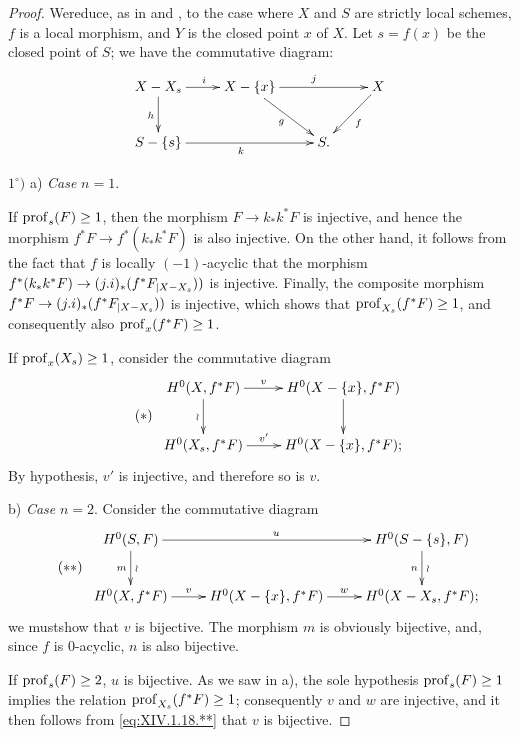 \begin{proof}
We\pageoriginale reduce, as in  and , to the case where $X$ and $S$ are strictly local schemes, $f$ is a local morphism, and $Y$ is the closed point $x$ of $X$. Let $s=f(x)$ be the closed point of $S$; we have the commutative diagram:
$$
\xymatrix{ X-X_s\ar[r]^i\ar[d]_h&X-\{x\}\ar[rd]_g\ar[rr]^j&&X\ar[ld]^f\\
S-\{s\}\ar[rr]_k&&S. }$$

$1^\circ)$ a) \textit{Case} $n=1$.

If $\prof_s(F)\geq 1$, then the morphism $F\to k_*k^*F$ is injective, and hence the morphism $f^*F\to f^*(k_*k^*F)$ is also injective. On the other hand, it follows from the fact that $f$ is locally $(-1)$-acyclic that the morphism $f^*(k_*k^*F)\to (j.i)_*(f^*\sisi{F{|X-X_s}}{F_{|X-X_s}}))$ is injective. Finally, the composite morphism $f^*F\to (j.i)_*(f^*\sisi{F{|X-X_s}}{F_{|X-X_s}}))$ is injective, which shows that $\prof_{X_s}(f^*F)\geq 1$, and consequently also $\prof_x(f^*F)\geq 1$.

If $\prof_x(X_s)\geq 1$, consider the commutative diagram
\begin{equation*} \label{eq:XIV.18.*} \tag{$*$}
\begin{array}{c}
\xymatrix{
H^0(X, f^*F)\ar[r]^-{v}\ar[d]_\wr&H^0(X-\{x\}, f^*F)\ar[d]\\
H^0(X_s, f^*F)\ar[r]^-{v'}&H^0(X-\{x\}, f^*F);
}
\end{array}
\end{equation*}
By hypothesis, $v'$ is injective, and therefore so is $v$.

b) \textit{Case} $n=2$. Consider the commutative diagram
\begin{equation*} \label{eq:XIV.1.18.**} \tag{$**$}
\begin{array}{c}
\xymatrix{ H^0(S, F)\ar[d]_{m}^{\wr}\ar[rr]^u&&H^0(S-\{s\}, F)\ar[d]^{\wr}_{ n}\\
H^0(X, f^*F)\ar[r]^-v&H^0(X-\{x\}, f^*F)\ar[r]^w&H^0(X-X_s, f^*F);
}
\end{array}
\end{equation*}
we must\pageoriginaled show that $v$ is bijective. The morphism $m$ is obviously bijective, and, since $f$ is $0$-acyclic, $n$ is also bijective.

If $\prof_s(F)\geq 2$, $u$ is bijective. As we saw in a), the sole hypothesis $\prof_s(F)\geq 1$ implies the relation $\prof_{X_s}(f^*F)\geq 1$; consequently $v$ and $w$ are injective, and it then follows from \eqref{eq:XIV.1.18.**} that $v$ is bijective.


\end{proof}
